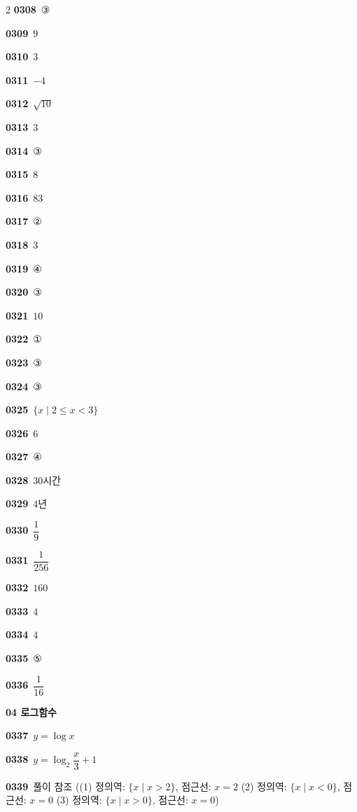 \documentclass[10pt,a4paper]{article}
\begin{document}
\begin{multicols}{2}
\noindent\textbf{0308}\ ③\par
\noindent\textbf{0309}\ $9$\par
\noindent\textbf{0310}\ $3$\par
\noindent\textbf{0311}\ $-4$\par
\noindent\textbf{0312}\ $\sqrt{10}$\par
\noindent\textbf{0313}\ $3$\par
\noindent\textbf{0314}\ ③\par
\noindent\textbf{0315}\ $8$\par
\noindent\textbf{0316}\ $83$\par
\noindent\textbf{0317}\ ②\par
\noindent\textbf{0318}\ $3$\par
\noindent\textbf{0319}\ ④\par
\noindent\textbf{0320}\ ③\par
\noindent\textbf{0321}\ $10$\par
\noindent\textbf{0322}\ ①\par
\noindent\textbf{0323}\ ③\par
\noindent\textbf{0324}\ ③\par
\noindent\textbf{0325}\ $\{x \mid 2\le x<3\}$\par
\noindent\textbf{0326}\ $6$\par
\noindent\textbf{0327}\ ④\par
\noindent\textbf{0328}\ $30$시간\par
\noindent\textbf{0329}\ $4$년\par
\noindent\textbf{0330}\ $\dfrac{1}{9}$\par
\noindent\textbf{0331}\ $\dfrac{1}{256}$\par
\noindent\textbf{0332}\ $160$\par
\noindent\textbf{0333}\ $4$\par
\noindent\textbf{0334}\ $4$\par
\noindent\textbf{0335}\ ⑤\par
\noindent\textbf{0336}\ $\dfrac{1}{16}$\par
\noindent\textbf{04 로그함수}\par\smallskip
\noindent\textbf{0337}\ $y=\log x$\par
\noindent\textbf{0338}\ $y=\log_2 \dfrac{x}{3}+1$\par
\noindent\textbf{0339}\ 풀이 참조 ((1) 정의역: $\{x \mid x>2\}$, 점근선: $x=2$ (2) 정의역: $\{x \mid x<0\}$, 점근선: $x=0$ (3) 정의역: $\{x \mid x>0\}$, 점근선: $x=0$)\par

\end{multicols}
\end{document}
